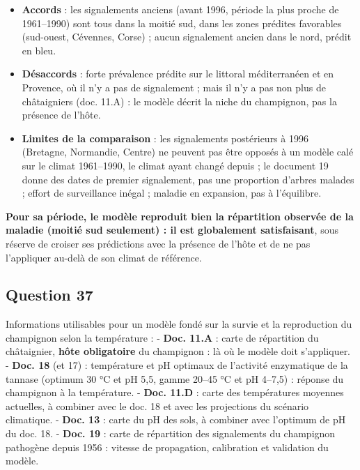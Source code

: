 \documentclass[11pt,a4paper]{article}
\providecommand{\tightlist}{\setlength{\itemsep}{0pt}\setlength{\parskip}{0pt}}
\begin{document}
\begin{itemize}
\tightlist
\item
  \textbf{Accords} : les signalements anciens (avant 1996, période la plus proche de 1961--1990) sont tous dans la moitié sud, dans les zones prédites favorables (sud-ouest, Cévennes, Corse) ; aucun signalement ancien dans le nord, prédit en bleu.
\item
  \textbf{Désaccords} : forte prévalence prédite sur le littoral méditerranéen et en Provence, où il n'y a pas de signalement ; mais il n'y a pas non plus de châtaigniers (doc. 11.A) : le modèle décrit la niche du champignon, pas la présence de l'hôte.
\item
  \textbf{Limites de la comparaison} : les signalements postérieurs à 1996 (Bretagne, Normandie, Centre) ne peuvent pas être opposés à un modèle calé sur le climat 1961--1990, le climat ayant changé depuis ; le document 19 donne des dates de premier signalement, pas une proportion d'arbres malades ; effort de surveillance inégal ; maladie en expansion, pas à l'équilibre.
\end{itemize}

\textbf{Pour sa période, le modèle reproduit bien la répartition observée de la maladie (moitié sud seulement) : il est globalement satisfaisant}, sous réserve de croiser ses prédictions avec la présence de l'hôte et de ne pas l'appliquer au-delà de son climat de référence.

\hypertarget{question-37}{%
\subsection{Question 37}\label{question-37}}

Informations utilisables pour un modèle fondé sur la survie et la reproduction du champignon selon la température :
- \textbf{Doc. 11.A} : carte de répartition du châtaignier, \textbf{hôte obligatoire} du champignon : là où le modèle doit s'appliquer.
- \textbf{Doc. 18} (et 17) : température et pH optimaux de l'activité enzymatique de la tannase (optimum 30 °C et pH 5,5, gamme 20--45 °C et pH 4--7,5) : réponse du champignon à la température.
- \textbf{Doc. 11.D} : carte des températures moyennes actuelles, à combiner avec le doc. 18 et avec les projections du scénario climatique.
- \textbf{Doc. 13} : carte du pH des sols, à combiner avec l'optimum de pH du doc. 18.
- \textbf{Doc. 19} : carte de répartition des signalements du champignon pathogène depuis 1956 : vitesse de propagation, calibration et validation du modèle.
\end{document}
